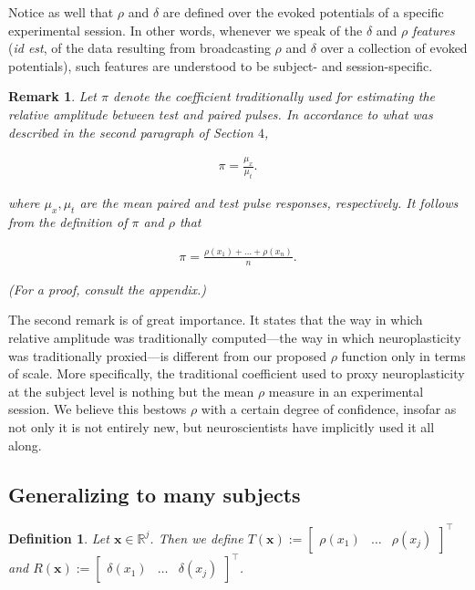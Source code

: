 \documentclass{article}
\newtheorem{definition}{Definition}
\newtheorem{remark}{Remark}
\begin{document}
\begin{multicols}{2}
Notice as well that $\rho$ and $\delta$ are defined over the evoked potentials
of a specific experimental session. In other words, whenever we speak of the
$\delta$ and $\rho$ \textit{features} (\textit{id est}, of the data resulting
from broadcasting $\rho$ and $\delta$ over a collection of evoked potentials),
such features are understood to be subject- and session-specific.

\begin{remark}
    Let $\pi$ denote the coefficient traditionally used for estimating the
    relative amplitude between test and paired pulses. In accordance to what was
    described in the second paragraph of Section $4$,

    \begin{align*}
        \pi = \frac{\mu_x}{\mu_t}
    .\end{align*}

    where $\mu_x, \mu_t$ are the mean paired and test pulse responses,
    respectively. It follows from the definition of $\pi$ and $\rho$ that

    \begin{align*}
        \pi = \frac{\rho(x_1) + \ldots + \rho(x_n)}{n}
    .\end{align*}

    (For a proof, consult the appendix.)
\end{remark}

The second remark is of great importance. It states that the way in which
relative amplitude was traditionally computed---the way in which neuroplasticity
was traditionally proxied---is different from our proposed $\rho$ function only
in terms of scale. More specifically, the traditional coefficient used to proxy
neuroplasticity at the subject level is nothing but the mean $\rho$
measure in an experimental session. We believe this bestows $\rho$ with a
certain degree of confidence, insofar as not only it is not entirely new, but
neuroscientists have implicitly used it all along.


\subsection{Generalizing to many subjects}


\begin{definition}
    Let $\textbf{x} \in \mathbb{R}^j$. Then we define $T(\textbf{x}) := \begin{bmatrix} 
        \rho(x_1) & \ldots & \rho(x_j)
    \end{bmatrix}^\intercal $ and $R(\textbf{x}) := \begin{bmatrix} 
        \delta(x_1) & \ldots & \delta(x_j) 
    \end{bmatrix}^\intercal $.
\end{definition}


\end{multicols}
\end{document}
